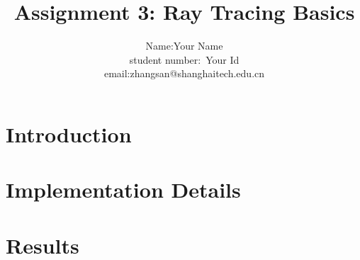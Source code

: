 \documentclass[acmtog]{acmart}
\title{Assignment 3: {Ray Tracing Basics}}
\author{Name:\quad Your Name  \\ student number:\ Your Id
\\email:\quad zhangsan@shanghaitech.edu.cn}
\begin{document}
\maketitle

\vspace*{2 ex}

\section{Introduction}

\section{Implementation Details}

\section{Results}
\end{document}
